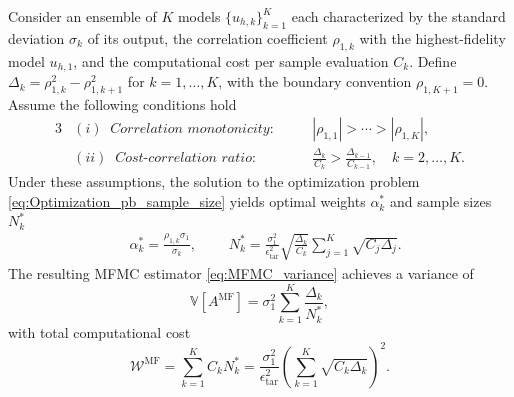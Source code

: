 %
\begin{theorem}
\label{thm:Sample_size_est}
Consider an ensemble of $K$ models $\{u_{h,k}\}_{k=1}^K$ each characterized by the standard deviation $\sigma_k$ of its output, the correlation coefficient $\rho_{1,k}$ with the highest-fidelity model $u_{h,1}$, and the computational cost per sample evaluation $C_k$. Define $\Delta_k = \rho_{1,k}^2 - \rho_{1,k+1}^2$ for $k = 1, \dots, K$, with the boundary convention $\rho_{1,K+1} = 0$. Assume the following conditions hold
%
\begin{alignat*}{3}
&(i)\;\; \textit{Correlation monotonicity}: \quad && |\rho_{1,1}| > \cdots > |\rho_{1,K}|, \\ 
&(ii)\;\; \textit{Cost-correlation ratio}: \quad && \frac{\Delta_{k}}{C_k} > \frac{\Delta_{k-1}}{C_{k-1}}, \quad k=2,\ldots,K. 
\end{alignat*}
%
Under these assumptions, the solution to the optimization problem \eqref{eq:Optimization_pb_sample_size} yields optimal weights $\alpha_k^*$ and sample sizes $N_k^*$
%
\begin{align}
    \label{eq:MFMC_SampleSize}
    &\alpha_k^*=\frac{\rho_{1,k}\sigma_1}{\sigma_k},\qquad \;N_k^*=\frac{\sigma_1^2}{\epsilon_\text{tar}^2}\sqrt{\frac{\Delta_{k}}{C_k}}\sum_{j=1}^K\sqrt{C_j\Delta_{j}}.
\end{align}
%
The resulting MFMC estimator \eqref{eq:MFMC_variance} achieves a variance of
%
\begin{equation}
\label{eq:MFMC_variance_optimal}
\mathbb{V}\left[A^{\text{MF}}\right] =
\sigma_1^2\sum_{k=1}^K\frac{\Delta_{k}}{N_k^*},
\end{equation}
%
with total computational cost
%
\begin{equation}\label{eq:MFMC_sampling_cost}
    \mathcal{W}^\text{MF} = \sum_{k=1}^K C_k N_k^* = \frac{\sigma_1^2}{\epsilon_{\text{tar}}^2}\left(\sum_{k=1}^K\sqrt{C_k\Delta_{k}}\right)^2.
\end{equation}
%
\end{theorem}

